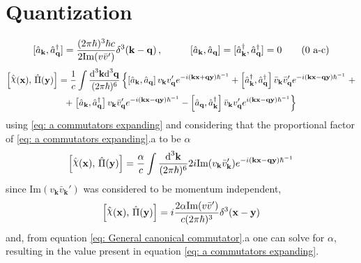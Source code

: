 \section{Quantization}
\begin{subequations}\label{eq: a commutators expanding}
	\begin{gather}
		[\hat{a}_\mathbf{k},\hat{a}_\mathbf{q}^\dagger]=\frac{(2\pi\hbar)^3\hbar c}{2\text{Im}(v\bar v')}\delta^3(\mathbf{k}-\mathbf{q})\,,\hspace{1.0cm}[\hat{a}_\mathbf{k},\hat{a}_\mathbf{q}]=[\hat{a}_\mathbf{k}^\dagger,\hat{a}_\mathbf{q}^\dagger]=0\tag{\theequation \,\,a-c}
	\end{gather}
\end{subequations}
\begin{multline}
	\left[\hat{\rchi}(\mathbf{x}),\,\hat{\Pi}(\mathbf{y})\right]=\frac{1}{c}\int\frac{\td^3\mathbf{k}\td^3\mathbf{q}}{(2\pi\hbar)^6}\left\{\left[\hat{a}_\mathbf{k},\hat{a}_\mathbf{q}\right]v_\mathbf{k}v'_\mathbf{q}e^{-i\left(\mathbf{kx}+\mathbf{qy}\right)\hbar^{-1}}+\left[\hat{a}_\mathbf{k}^\dagger, \hat{a}_\mathbf{q}^\dagger\right]\bar v_\mathbf{k}\bar v_\mathbf{q}'e^{-i(\mathbf{kx}-\mathbf{qy})\hbar^{-1}}\right.+\\
	+\left.\left[\hat{a}_\mathbf{k},\hat{a}_\mathbf{q}^\dagger\right] v_\mathbf{k}\bar v'_\mathbf{q}e^{-i(\mathbf{kx}-\mathbf{qy})\hbar^{-1}}-\left[\hat{a}_\mathbf{q},\hat{a}_\mathbf{k}^\dagger\right]\bar v_\mathbf{k}v_\mathbf{q}'e^{i(\mathbf{kx}-\mathbf{qy})\hbar^{-1}}\right\}
\end{multline}
using \cref{eq: a commutators expanding} and considering that the proportional factor of \ref{eq: a commutators expanding}.a to be $\alpha$
\begin{equation}
	\left[\hat{\rchi}(\mathbf{x}),\,\hat{\Pi}(\mathbf{y})\right]=\frac{\alpha}{c}\int\frac{\td^3\mathbf{k}}{(2\pi\hbar)^6}2i\text{Im}(v_\mathbf{k}\bar v_\mathbf{k}')e^{-i(\mathbf{kx}-\mathbf{qy})\hbar^{-1}}
\end{equation}
since $\text{Im}(v_\mathbf{k}\bar v_\mathbf{k}')$ was considered to be momentum independent,
\begin{equation}
	\left[\hat{\rchi}(\mathbf{x}),\,\hat{\Pi}(\mathbf{y})\right]=i\frac{2\alpha\text{Im}(v\bar v')}{c(2\pi\hbar)^3}\delta^3(\mathbf{x}-\mathbf{y})
\end{equation}
and, from equation \ref{eq: General canonical commutator}.a one can solve for $\alpha$, resulting in the value present in equation \ref{eq: a commutators expanding}.




